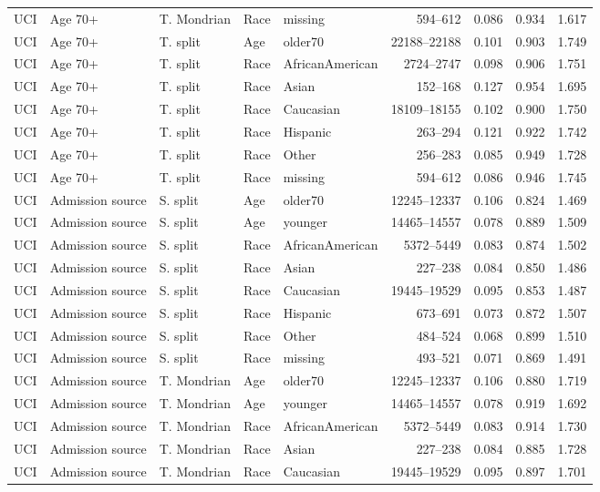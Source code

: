 \begin{longtable}{L{0.9cm}L{1.55cm}L{1.45cm}L{1.1cm}L{1.8cm}r r r r}
UCI & Age 70+ & T. Mondrian & Race & missing & 594--612 & 0.086 & 0.934 & 1.617 \\
UCI & Age 70+ & T. split & Age & older70 & 22188--22188 & 0.101 & 0.903 & 1.749 \\
UCI & Age 70+ & T. split & Race & AfricanAmerican & 2724--2747 & 0.098 & 0.906 & 1.751 \\
UCI & Age 70+ & T. split & Race & Asian & 152--168 & 0.127 & 0.954 & 1.695 \\
UCI & Age 70+ & T. split & Race & Caucasian & 18109--18155 & 0.102 & 0.900 & 1.750 \\
UCI & Age 70+ & T. split & Race & Hispanic & 263--294 & 0.121 & 0.922 & 1.742 \\
UCI & Age 70+ & T. split & Race & Other & 256--283 & 0.085 & 0.949 & 1.728 \\
UCI & Age 70+ & T. split & Race & missing & 594--612 & 0.086 & 0.946 & 1.745 \\
UCI & Admission source & S. split & Age & older70 & 12245--12337 & 0.106 & 0.824 & 1.469 \\
UCI & Admission source & S. split & Age & younger & 14465--14557 & 0.078 & 0.889 & 1.509 \\
UCI & Admission source & S. split & Race & AfricanAmerican & 5372--5449 & 0.083 & 0.874 & 1.502 \\
UCI & Admission source & S. split & Race & Asian & 227--238 & 0.084 & 0.850 & 1.486 \\
UCI & Admission source & S. split & Race & Caucasian & 19445--19529 & 0.095 & 0.853 & 1.487 \\
UCI & Admission source & S. split & Race & Hispanic & 673--691 & 0.073 & 0.872 & 1.507 \\
UCI & Admission source & S. split & Race & Other & 484--524 & 0.068 & 0.899 & 1.510 \\
UCI & Admission source & S. split & Race & missing & 493--521 & 0.071 & 0.869 & 1.491 \\
UCI & Admission source & T. Mondrian & Age & older70 & 12245--12337 & 0.106 & 0.880 & 1.719 \\
UCI & Admission source & T. Mondrian & Age & younger & 14465--14557 & 0.078 & 0.919 & 1.692 \\
UCI & Admission source & T. Mondrian & Race & AfricanAmerican & 5372--5449 & 0.083 & 0.914 & 1.730 \\
UCI & Admission source & T. Mondrian & Race & Asian & 227--238 & 0.084 & 0.885 & 1.728 \\
UCI & Admission source & T. Mondrian & Race & Caucasian & 19445--19529 & 0.095 & 0.897 & 1.701 \\

\end{longtable}
